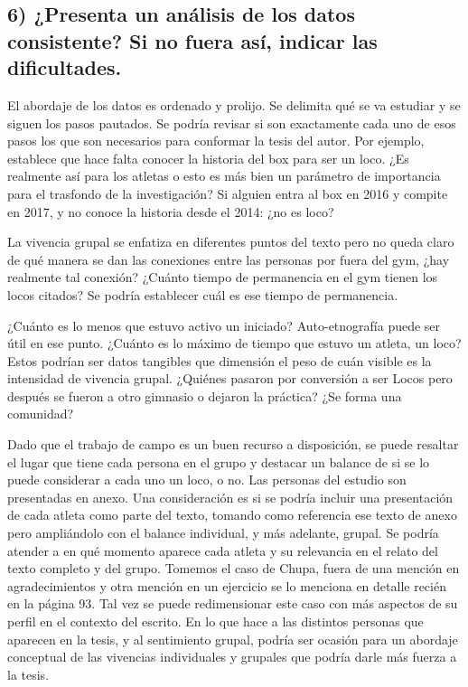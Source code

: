 \subsection*{6) ¿Presenta un análisis de los datos consistente? Si no fuera así, indicar las dificultades.}
\label{presenta-un-anuxe1lisis-de-los-datos-consistente-si-no-fuera-asuxed-indicar-las-dificultades.}

El abordaje de los datos es ordenado y prolijo.
Se delimita qué se va estudiar y se siguen los pasos pautados.
Se podría revisar si son exactamente cada uno de esos pasos los que son necesarios para conformar la tesis del autor.
Por ejemplo, establece que hace falta conocer la historia del box para ser un loco.
¿Es realmente así para los atletas o esto es más bien un parámetro de importancia para el trasfondo de la investigación? 
Si alguien entra al box en 2016 y compite en 2017, y no conoce la historia desde el 2014: ¿no es loco?

La vivencia grupal se enfatiza en diferentes puntos del texto pero no queda claro de qué manera se dan
las conexiones entre las personas por fuera del gym,
¿hay realmente tal conexión? 
¿Cuánto tiempo de permanencia en el gym tienen los locos citados?
Se podría establecer cuál es ese tiempo de permanencia. 

¿Cuánto es lo menos que estuvo activo un iniciado? Auto-etnografía puede ser útil en ese punto.
¿Cuánto es lo máximo de tiempo que estuvo un atleta, un loco?
Estos podrían ser datos tangibles que dimensión el peso de cuán visible es la intensidad de vivencia grupal.
¿Quiénes pasaron por conversión a ser Locos pero después se fueron a otro gimnasio o dejaron la práctica?
¿Se forma una comunidad? 

Dado que el trabajo de campo es un buen recurso a disposición, se puede
resaltar el lugar que tiene cada persona en el grupo y destacar un
balance de si se lo puede considerar a cada uno un loco, o no. %
Las personas del estudio son presentadas en anexo. 
Una consideración es si se podría incluir una presentación de cada atleta como parte del texto,
tomando como referencia ese texto de anexo pero ampliándolo con el balance individual, y más adelante, grupal.
Se podría atender a en qué momento aparece cada atleta y su relevancia en el relato del texto completo y del grupo.
%
Tomemos el caso de Chupa, fuera de una mención en agradecimientos y otra mención en un ejercicio se lo menciona en detalle recién en la página 93. Tal vez se puede redimensionar este caso con más aspectos de su perfil en el contexto del escrito.
%
En lo que hace a las distintos personas que aparecen en la tesis, y al sentimiento grupal,
podría ser ocasión para un abordaje conceptual de las vivencias individuales y grupales que podría darle más fuerza a la tesis.

